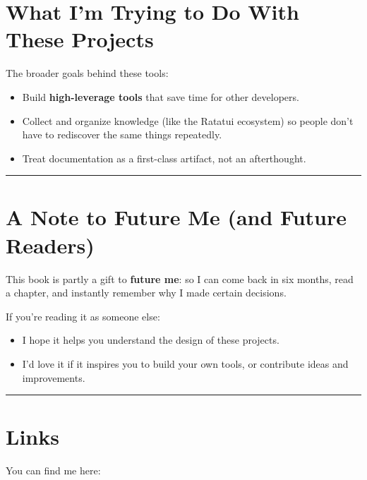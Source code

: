 \documentclass[
  letterpaper,
  DIV=11,
  numbers=noendperiod]{scrreprt}
\providecommand{\tightlist}{%
  \setlength{\itemsep}{0pt}\setlength{\parskip}{0pt}}
\begin{document}
\section{What I'm Trying to Do With These
Projects}\label{what-im-trying-to-do-with-these-projects}

The broader goals behind these tools:

\begin{itemize}
\tightlist
\item
  Build \textbf{high-leverage tools} that save time for other
  developers.\\
\item
  Collect and organize knowledge (like the Ratatui ecosystem) so people
  don't have to rediscover the same things repeatedly.
\item
  Treat documentation as a first-class artifact, not an afterthought.
\end{itemize}

\begin{center}\rule{0.5\linewidth}{0.5pt}\end{center}

\section{A Note to Future Me (and Future
Readers)}\label{a-note-to-future-me-and-future-readers}

This book is partly a gift to \textbf{future me}: so I can come back in
six months, read a chapter, and instantly remember why I made certain
decisions.

If you're reading it as someone else:

\begin{itemize}
\tightlist
\item
  I hope it helps you understand the design of these projects.
\item
  I'd love it if it inspires you to build your own tools, or contribute
  ideas and improvements.
\end{itemize}

\begin{center}\rule{0.5\linewidth}{0.5pt}\end{center}

\section{Links}\label{links}

You can find me here:
\end{document}

